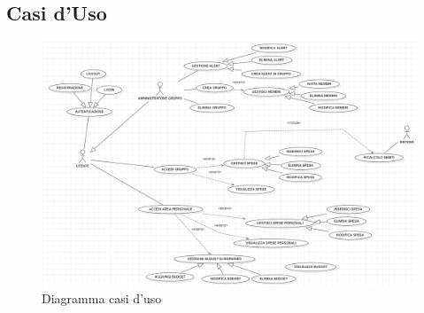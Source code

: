 \subsection{Casi d'Uso}

    \begin{figure}[h]
        \centering
        \includegraphics[scale=0.6]{images/casousoprova.png}
        \caption{Diagramma casi d'uso }
    \end{figure}

